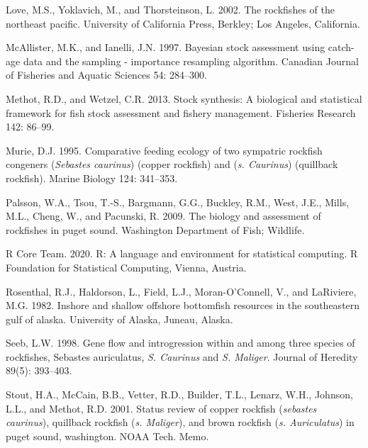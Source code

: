 \documentclass[11pt,
  english,
  letterpaper,
]{article}
\begin{document}
\leavevmode\hypertarget{ref-loveetal_2002}{}%
Love, M.S., Yoklavich, M., and Thorsteinson, L. 2002. The rockfishes of the northeast pacific. University of California Press, Berkley; Los Angeles, California.

\leavevmode\hypertarget{ref-mcallister_bayesian_1997}{}%
McAllister, M.K., and Ianelli, J.N. 1997. Bayesian stock assessment using catch-age data and the sampling - importance resampling algorithm. Canadian Journal of Fisheries and Aquatic Sciences 54: 284--300.

\leavevmode\hypertarget{ref-methot_stock_2013}{}%
Methot, R.D., and Wetzel, C.R. 2013. Stock synthesis: A biological and statistical framework for fish stock assessment and fishery management. Fisheries Research 142: 86--99.

\leavevmode\hypertarget{ref-Murie_diet_1995}{}%
Murie, D.J. 1995. Comparative feeding ecology of two sympatric rockfish congeners (\emph{Sebastes caurinus}) (copper rockfish) and (\emph{s. Caurinus}) (quillback rockfish). Marine Biology 124: 341--353.

\leavevmode\hypertarget{ref-Palssonetal_2009}{}%
Palsson, W.A., Tsou, T.-S., Bargmann, G.G., Buckley, R.M., West, J.E., Mills, M.L., Cheng, W., and Pacunski, R. 2009. The biology and assessment of rockfishes in puget sound. Washington Department of Fish; Wildlife.

\leavevmode\hypertarget{ref-R_2020}{}%
R Core Team. 2020. R: A language and environment for statistical computing. R Foundation for Statistical Computing, Vienna, Austria.

\leavevmode\hypertarget{ref-Rosenthaletal_maturity_1982}{}%
Rosenthal, R.J., Haldorson, L., Field, L.J., Moran-O'Connell, V., and LaRiviere, M.G. 1982. Inshore and shallow offshore bottomfish resources in the southeastern gulf of alaska. University of Alaska, Juneau, Alaska.

\leavevmode\hypertarget{ref-seeb_gene_1998}{}%
Seeb, L.W. 1998. Gene flow and introgression within and among three species of rockfishes, Sebastes auriculatus, \emph{S. Caurinus} and \emph{S. Maliger}. Journal of Heredity 89(5): 393--403.

\leavevmode\hypertarget{ref-Stoutetal_DPS_2001}{}%
Stout, H.A., McCain, B.B., Vetter, R.D., Builder, T.L., Lenarz, W.H., Johnson, L.L., and Methot, R.D. 2001. Status review of copper rockfish (\emph{sebastes caurinus}), quillback rockfish (\emph{s. Maliger}), and brown rockfish (\emph{s. Auriculatus}) in puget sound, washington. NOAA Tech. Memo.
\end{document}
